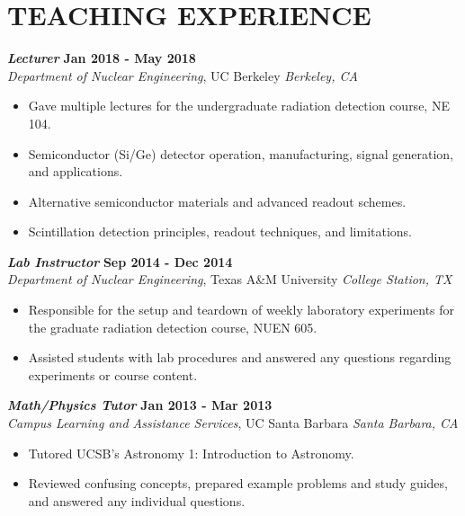 \section{\small{TEACHING EXPERIENCE}}

{\sl\bf Lecturer} \hfill {\bf Jan 2018 - May 2018} \\
{\sl Department of Nuclear Engineering}, UC Berkeley \hfill {\sl Berkeley, CA}\\[-2.8ex]
\vspace{2pt}
\begin{itemize}[leftmargin=4ex] \itemsep -2pt
\item Gave multiple lectures for the undergraduate radiation detection course, NE 104.
\item Semiconductor (Si/Ge) detector operation, manufacturing, signal generation, and applications.
\item Alternative semiconductor materials and advanced readout schemes.
\item Scintillation detection principles, readout techniques, and limitations.
\end{itemize} 

{\sl\bf Lab Instructor} \hfill {\bf Sep 2014 - Dec 2014} \\
{\sl Department of Nuclear Engineering}, Texas A\&M University \hfill {\sl College Station, TX}\\[-2.8ex]
\vspace{2pt}
\begin{itemize}[leftmargin=4ex] \itemsep -2pt
\item Responsible for the setup and teardown of weekly laboratory experiments for the graduate radiation detection course, NUEN 605.
\item Assisted students with lab procedures and answered any questions regarding experiments or course content.
\end{itemize} 

{\sl\bf Math/Physics Tutor} \hfill {\bf Jan 2013 - Mar 2013} \\
{\sl Campus Learning and Assistance Services}, UC Santa Barbara \hfill {\sl Santa Barbara, CA} \\[-2.8ex]
\vspace{2pt}
\begin{itemize}[leftmargin=4ex] \itemsep -2pt
\item Tutored UCSB's Astronomy 1: Introduction to Astronomy. 		
\item Reviewed confusing concepts, prepared example problems and study guides, and answered any individual questions.
\end{itemize} 